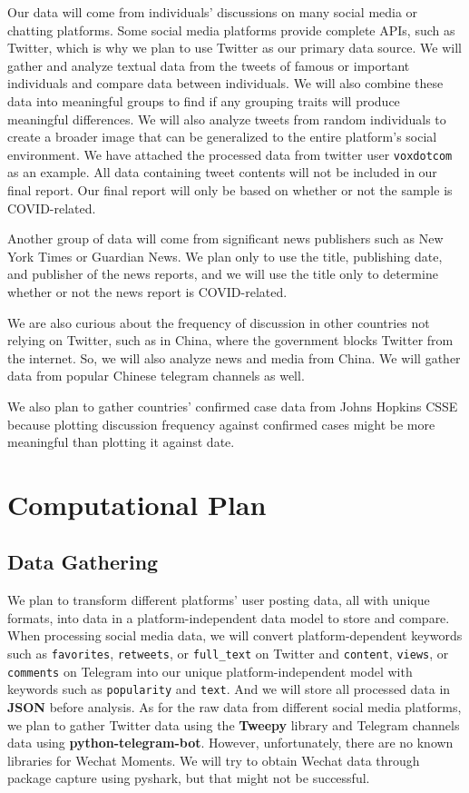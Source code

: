 \documentclass[fontsize=11pt]{article}
\begin{document}
    Our data will come from individuals’ discussions on many social media or chatting platforms. Some social media platforms provide complete APIs, such as Twitter, which is why we plan to use Twitter as our primary data source. We will gather and analyze textual data from the tweets of famous or important individuals and compare data between individuals. We will also combine these data into meaningful groups to find if any grouping traits will produce meaningful differences. We will also analyze tweets from random individuals to create a broader image that can be generalized to the entire platform’s social environment. We have attached the processed data from twitter user \texttt{voxdotcom} as an example. All data containing tweet contents will not be included in our final report. Our final report will only be based on whether or not the sample is COVID-related.

    Another group of data will come from significant news publishers such as New York Times or Guardian News. We plan only to use the title, publishing date, and publisher of the news reports, and we will use the title only to determine whether or not the news report is COVID-related.

    We are also curious about the frequency of discussion in other countries not relying on Twitter, such as in China, where the government blocks Twitter from the internet. So, we will also analyze news and media from China. We will gather data from popular Chinese telegram channels as well.

    We also plan to gather countries’ confirmed case data from Johns Hopkins CSSE because plotting discussion frequency against confirmed cases might be more meaningful than plotting it against date.

    \section*{Computational Plan}

    \subsection*{Data Gathering}

    \indent

    We plan to transform different platforms’ user posting data, all with unique formats, into data in a platform-independent data model to store and compare. When processing social media data, we will convert platform-dependent keywords such as \texttt{favorites}, \texttt{retweets}, or \texttt{full\_text} on Twitter and \texttt{content}, \texttt{views}, or \texttt{comments} on Telegram into our unique platform-independent model with keywords such as \texttt{popularity} and \texttt{text}. And we will store all processed data in \textbf{JSON} before analysis. As for the raw data from different social media platforms, we plan to gather Twitter data using the \textbf{Tweepy} library and Telegram channels data using \textbf{python-telegram-bot}. However, unfortunately, there are no known libraries for Wechat Moments. We will try to obtain Wechat data through package capture using pyshark, but that might not be successful.
\end{document}
